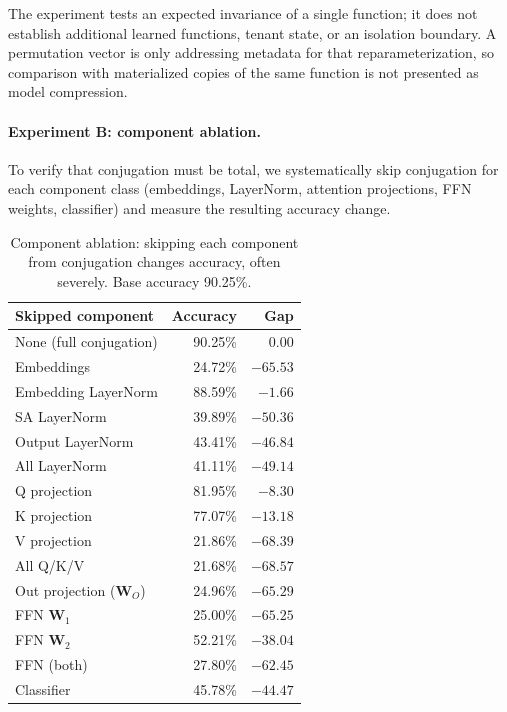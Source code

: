 \documentclass[11pt,a4paper]{article}
\newcommand{\bW}{\mathbf{W}}
\begin{document}
The experiment tests an expected invariance of a single function; it
does not establish additional learned functions, tenant state, or an
isolation boundary.  A permutation vector is only addressing metadata
for that reparameterization, so comparison with materialized copies
of the same function is not presented as model compression.

\paragraph{Experiment B: component ablation.}
To verify that conjugation must be total, we systematically
skip conjugation for each component class (embeddings, LayerNorm,
attention projections, FFN weights, classifier) and measure
the resulting accuracy change.

\begin{table}[ht]
\centering
\caption{Component ablation: skipping each component from
conjugation changes accuracy, often severely.  Base accuracy 90.25\%.}
\label{tab:ablation}
\small
\begin{tabular}{@{}lrr@{}}
\toprule
\textbf{Skipped component} & \textbf{Accuracy} & \textbf{Gap} \\
\midrule
None (full conjugation) & 90.25\% & $0.00$ \\
\midrule
Embeddings & 24.72\% & $-65.53$ \\
Embedding LayerNorm & 88.59\% & $-1.66$ \\
SA LayerNorm & 39.89\% & $-50.36$ \\
Output LayerNorm & 43.41\% & $-46.84$ \\
All LayerNorm & 41.11\% & $-49.14$ \\
Q projection & 81.95\% & $-8.30$ \\
K projection & 77.07\% & $-13.18$ \\
V projection & 21.86\% & $-68.39$ \\
All Q/K/V & 21.68\% & $-68.57$ \\
Out projection ($\bW_O$) & 24.96\% & $-65.29$ \\
FFN $\bW_1$ & 25.00\% & $-65.25$ \\
FFN $\bW_2$ & 52.21\% & $-38.04$ \\
FFN (both) & 27.80\% & $-62.45$ \\
Classifier & 45.78\% & $-44.47$ \\
\bottomrule
\end{tabular}
\end{table}
\end{document}
